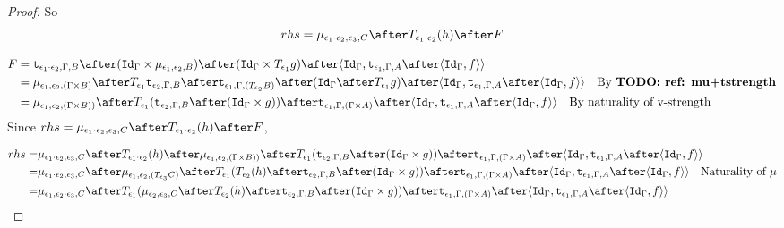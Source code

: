 \documentclass{report}
\begin{document}
\begin{framed}
\begin{proof}
        So 
        \begin{equation}
            rhs = \bind{\e_1\dot\e_2}{\e_3}{C}\after\T{\e_1\dot\e_2}{(h)}\after F
        \end{equation}
        
        \begin{equation}
            \begin{split}
                F & = \tstrength{\e_1\dot\e_2}{\G}{B}\after(\idg\times\bind{\e_1}{\e_2}{B})\after(\idg\times\T{\e_1}{g})\after\pr{\idg}{\tstrength{\e_1}{\G}{A}\after\pr{\idg}{f}}\\
                &  = \bind{\e_1}{\e_2}{(\G\times B)} \after \T{\e_1}{\tstrength{\e_2}{\G}{B}} \after\tstrength{\e_1}{\G}{(\T{\e_2}{B})} \after (\idg \after\T{\e_1}{g})\after\pr{\idg}{\tstrength{\e_1}{\G}{A}\after\pr{\idg}{f}}\qt{By \todo{ref: mu+tstrength}}
                \\ & = \bind{\e_1}{\e_2}{(\G \times B))} \after \T{\e_1}{(\tstrength{\e_2}{\G}{B} \after (\idg \times g))} \after \tstrength{\e_1}{\G}{(\G \times A)} \after \pr{\idg}{\tstrength{\e_1}{\G}{A}\after\pr{\idg}{f}}\qt{By naturality of v-strength}
            \end{split}
        \end{equation}
        Since
        $
            rhs = \bind{\e_1\dot\e_2}{\e_3}{C}\after\T{\e_1\dot\e_2}{(h)}\after F
        $, 
        
        \begin{equation}
            \begin{split}
                rhs = &\bind{\e_1\dot\e_2}{\e_3}{C}\after\T{\e_1\dot\e_2}{(h)}\after\bind{\e_1}{\e_2}{(\G \times B))} \after \T{\e_1}{(\tstrength{\e_2}{\G}{B} \after (\idg \times g))} \after \tstrength{\e_1}{\G}{(\G \times A)} \after \pr{\idg}{\tstrength{\e_1}{\G}{A}\after\pr{\idg}{f}}\\
                = &\bind{\e_1\dot\e_2}{\e_3}{C}\after\bind{\e_1}{\e_2}{(\T{\e_3}{C})}\after\T{\e_1}{(\T{\e_2}{(h)} \after \tstrength{\e_2}{\G}{B} \after (\idg \times g))} \after \tstrength{\e_1}{\G}{(\G \times A)} \after \pr{\idg}{\tstrength{\e_1}{\G}{A}\after\pr{\idg}{f}}\qt{Naturality of $\mu$}\\
                = & \bind{\e_1}{\e_2\dot\e_3}{C}\after\T{\e_1}{(\bind{\e_2}{\e_3}{C}\after \T{\e_2}{(h)} \after \tstrength{\e_2}{\G}{B} \after (\idg \times g))} \after \tstrength{\e_1}{\G}{(\G \times A)} \after \pr{\idg}{\tstrength{\e_1}{\G}{A}\after\pr{\idg}{f}}
            \end{split}
        \end{equation}
        

\end{proof}
\end{framed}
\end{document}

